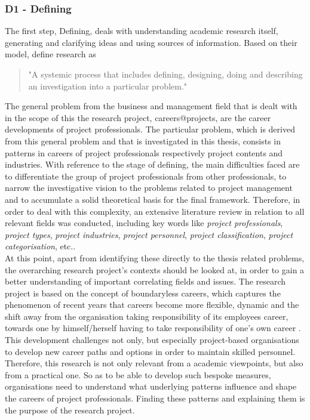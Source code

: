 \subsubsection{D1 - Defining}
The first step, Defining, deals with understanding academic research itself, generating and clarifying ideas and using sources of information. Based on their model,  define research as 
\begin{quote}
"A systemic process that includes defining, designing, doing and describing an investigation into a particular problem."
\end{quote}
The general problem from the business and management field that is dealt with in the scope of this the research project, careers@projects, are the career developments of project professionals. The particular problem, which is derived from this general problem and that is investigated in this thesis, consists in patterns in careers of project professionals respectively project contents and industries. With reference to the stage of defining, the main difficulties faced are to differentiate the group of project professionals from other professionals, to narrow the investigative vision to the problems related to project management and to accumulate a solid theoretical basis for the final framework. Therefore, in order to deal with this complexity, an extensive literature review in relation to all relevant fields was conducted, including key words like \textit{project professionals}, \textit{project types}, \textit{project industries}, \textit{project personnel}, \textit{project classification}, \textit{project categorisation}, etc.. \\
At this point, apart from identifying these directly to the thesis related problems, the overarching research project's contexts should be looked at, in order to gain a better understanding of important correlating fields and issues. The research project is based on the concept of boundaryless careers, which captures the phenomenon of recent years that careers become more flexible, dynamic and the shift away from the organisation taking responsibility of its employees career, towards one by himself/herself having to take responsibility of one's own career \cite{inkson09}. This development challenges not only, but especially project-based organisations to develop new career paths and options in order to maintain skilled personnel. Therefore, this research is not only relevant from a academic viewpoints, but also from a practical one. So as to be able to develop such bespoke measures, organisations need to understand what underlying patterns influence and shape the careers of project professionals. Finding these patterns and explaining them is the purpose of the research project.\\

